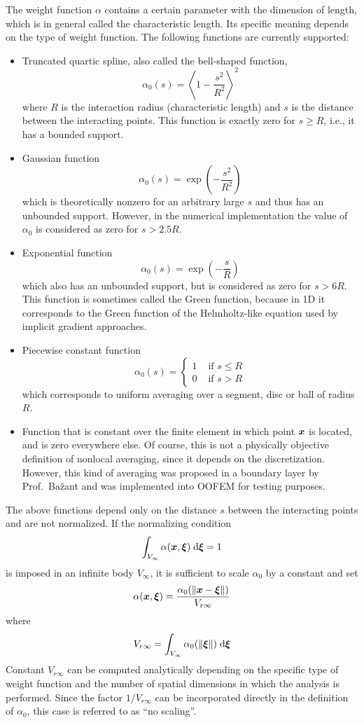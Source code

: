 \documentclass[a4paper]{article}
\newcommand{\mbf}[1]{\mbox{\boldmath$#1$}}
\begin{document}
The weight function $\alpha$ contains a certain parameter with the dimension
of length, which is in general called the characteristic length. Its specific
meaning depends on the type of weight function. The following functions are
currently supported:
\begin{itemize}
\item
Truncated quartic spline, also called the bell-shaped function,
$$
\alpha_0(s) = \left\langle 1-\frac{s^2}{R^2}\right\rangle^2
$$
where $R$ is the interaction radius (characteristic length) and 
$s$ is the distance between the interacting points. This function 
is exactly zero for $s\ge R$, i.e., it has a bounded support.
\item
Gaussian function
$$
\alpha_0(s) = \exp\left(-\frac{s^2}{R^2}\right)
$$
which is theoretically nonzero for an arbitrary large $s$ and thus
has an unbounded support. However, in the numerical implementation
the value of $\alpha_0$ is considered as zero for $s>2.5R$.
\item
Exponential function
$$
\alpha_0(s) = \exp\left(-\frac{s}{R}\right)
$$
which also has an unbounded support, but is considered as zero for $s>6R$.
This function is sometimes called the Green function, because in 1D it
corresponds to the Green function of the Helmholtz-like equation used
by implicit gradient approaches.
\item
Piecewise constant function
$$
\alpha_0(s) =\left\{\begin{array}{cc} 1 & \mbox{ if } s\le R \\ 0 & \mbox{ if } s> R \end{array}\right.
$$
which corresponds to uniform averaging over a segment, disc or ball
of radius $R$. 
\item
Function that is constant over the finite element in which point $\mbf{x}$
is located, and is zero everywhere else. Of course, this is not a physically
objective definition of nonlocal averaging, since it depends on the
discretization. However, this kind of averaging was proposed in a boundary
layer by Prof.\ Ba\v{z}ant and was implemented into OOFEM for testing purposes.
\end{itemize}  
 
The above functions depend only on the distance $s$ between the interacting
points and are not normalized. If the normalizing
condition
$$
\int_{V_\infty} \alpha(\mbf{x},\mbf{\xi})\;{\rm d}\mbf{\xi} = 1
$$
is imposed in an infinite body $V_{\infty}$, it is sufficient to scale
$\alpha_0$ by a constant and set
$$
\alpha(\mbf{x},\mbf{\xi})=\frac{\alpha_0(\Vert\mbf{x}-\mbf{\xi}\Vert)}{V_{r\infty}}
$$
where
$$
V_{r\infty} = \int_{V_\infty} \alpha_0(\Vert\mbf{\xi}\Vert)\;{\rm d}\mbf{\xi} 
$$
Constant $V_{r\infty}$ can be computed analytically depending on the specific
type of weight function and the number of spatial dimensions in which the
analysis is performed. Since the factor $1/V_{r\infty}$ can be incorporated directly
in the definition of $\alpha_0$, this case is referred to as ``no scaling''.
\end{document}

